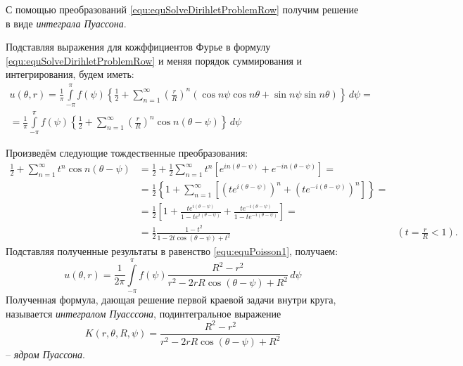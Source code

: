 С помощью преобразований \eqref{equ:equSolveDirihletProblemRow} получим решение в виде \textit{интеграла Пуассона}.

Подставляя выражения для кожффициентов Фурье в формулу \eqref{equ:equSolveDirihletProblemRow} и меняя порядок суммирования и интегрирования, будем иметь:
\begin{multline}
	u(\theta, r) = \frac{1}{\pi} \int\limits_{-\pi}^{\pi} f(\psi) \left\{ \frac{1}{2} + \sum\limits_{n = 1}^{\infty} \left(\frac{r}{R} \right)^n (\cos n \psi \cos n \theta + \sin n \psi \sin n \theta) \right\} \, d \psi = \\
	=  \frac{1}{\pi} \int\limits_{-\pi}^{\pi} f(\psi) \left\{ \frac{1}{2} + \sum\limits_{n = 1}^{\infty} \left(\frac{r}{R} \right)^n \cos n(\theta - \psi) \right\} \, d \psi 
	\label{equ:equPoisson1}
\end{multline}

Произведём следующие тождественные преобразования:
\begin{align*}
	\frac{1}{2} + \sum\limits_{n = 1}^{\infty} t^n \cos n (\theta - \psi) &= \frac{1}{2} + \frac{1}{2} \sum\limits_{n = 1}^{\infty} t^n \left[e^{in(\theta - \psi)} + e^{-in(\theta - \psi)}\right] = \\
	&= \frac{1}{2}\left\{1 + \sum\limits_{n = 1}^{\infty} [\left(t e^{i(\theta - \psi)}\right)^n + \left(t e^{-i(\theta - \psi)}\right)^n] \right\} =\\
	&= \frac{1}{2} \left[ 1 + \frac{t e^{i(\theta - \psi)}}{1 - t e^{i(\theta - \psi)}}  + \frac{t e^{-i(\theta - \psi)}}{1 - t e^{-i(\theta - \psi)}}\right] = \\
	&= \frac{1}{2} \frac{1 - t^2}{1 - 2t \cos(\theta - \psi) + t^2} &\left(t = \frac{r}{R} < 1 \right).
\end{align*}
Подставляя полученные результаты в равенство \eqref{equ:equPoisson1}, получаем:
\begin{equation}
	u (\theta, r) = \frac{1}{2 \pi} \int\limits_{- \pi}^{\pi} f(\psi) \frac{R^2 - r^2}{r^2 - 2  r R \cos (\theta - \psi) + R^2} \, d \psi
	\label{equ:PuassonInt}
\end{equation}
Полученная формула, дающая решение первой краевой задачи внутри круга, называется \textit{интегралом Пуасссона}, подинтегральное выражение 
\[
	K(r, \theta, R, \psi) = \frac{R^2 - r^2}{r^2 - 2 r  R \cos (\theta - \psi) + R^2}
\]
-- \textit{ядром Пуассона}.

